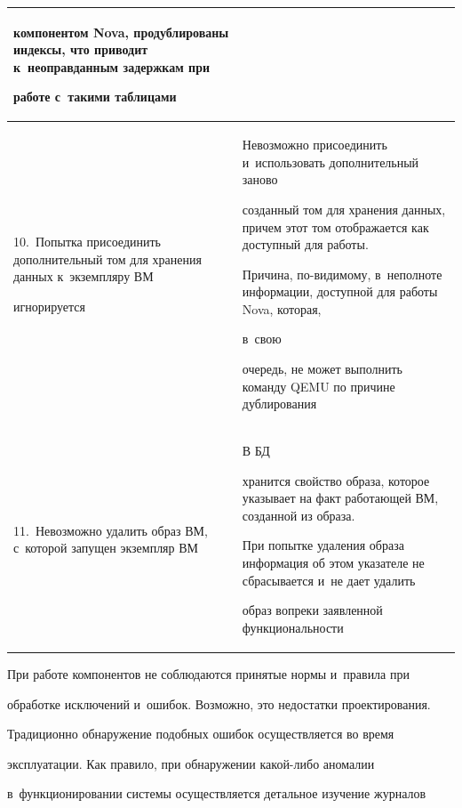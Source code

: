 \begin{table}
\begin{center}
\begin{tabular}{|p{30mm}|p{91mm}|}
компонентом Nova, продублированы индексы, что приводит к~неоправданным задержкам при 


работе с~такими таблицами \\


\hline


10.~Попытка присоединить дополнительный том для хранения данных к~экземпляру ВМ 


игнорируется~\cite{12-g7}&Невозможно присоединить и~использовать дополнительный заново 


созданный том для хранения данных, причем этот том отображается как доступный для работы. 


Причина, по-ви\-ди\-мо\-му, в~неполноте информации, доступной для работы Nova, которая,


 в~свою 


очередь, не может выполнить команду QEMU по причине дублирования\\


\hline


11.~Невозможно удалить образ ВМ, с~которой запущен экземпляр ВМ~\cite{13-g7}&В БД 


хранится свойство образа, которое указывает на факт работающей ВМ, созданной из образа. 


При попытке удаления образа информация об этом указателе не сбрасывается и~не дает удалить 


образ вопреки заявленной функциональности\\


\hline


  \end{tabular}


  \end{center}


  \end{table}





  При работе компонентов не соблюдаются принятые нормы и~правила при 


обработке исключений и~ошибок. Возможно, это недостатки проектирования. 


  


  Традиционно обнаружение подобных ошибок осуществляется во время 


эксплуатации. Как правило, при обнаружении какой-либо аномалии 


в~функционировании системы осуществляется детальное изучение журналов 


